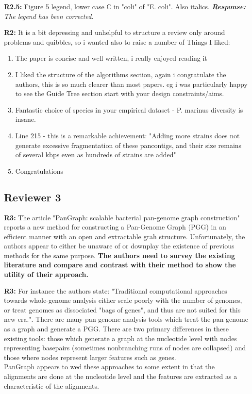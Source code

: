 \documentclass[aps,rmp,onecolumn]{revtex4-1}
\newcommand{\Marco}[1]{{\color{gray}Marco: #1}}
\newcommand{\reviewer}[2]{\textbf{#1:} #2\vskip 5mm}
\newcommand{\response}[1]{{\it {\color{response}\textbf{Response:} #1}}\vskip 5mm}
\begin{document}
\reviewer{R2.5}{Figure 5 legend, lower case C in "coli" of "E. coli". Also italics.}
\response{The legend has been corrected.}


\reviewer{R2}{It is a bit depressing and unhelpful to structure a review only around problems and quibbles, so i wanted also to raise a number of
      Things I liked:

      \begin{enumerate}
            \item The paper is concise and well written, i really enjoyed reading it
            \item I liked the structure of the algorithms section, again i congratulate the authors, this is so much clearer than most papers. eg i was particularly happy to see the Guide Tree section start with your design constraints/aims.
            \item Fantastic choice of species in your empirical dataset - P. marinus diversity is insane.
            \item Line 215 - this is a remarkable achievement: "Adding more strains does not generate excessive fragmentation of these pancontigs, and their size remains of several kbps even as hundreds of strains are added"
            \item Congratulations
      \end{enumerate}
}


\subsection*{Reviewer 3}

\reviewer{R3}{The article "PanGraph: scalable bacterial pan-genome graph construction" reports a new method for constructing a Pan-Genome Graph (PGG) in an efficient manner with an open and extractable grah structure. Unfortunately, the authors appear to either be unaware of or downplay the existence of previous methods for the same purpose.\textbf{ The authors need to survey the existing literature and compare and contrast with their method to show the utility of their approach.}}

\reviewer{R3}{For instance the authors state: "Traditional computational approaches towards whole-genome analysis either scale poorly with the number of genomes, or treat genomes as dissociated "bags of genes", and thus are not suited for this new era.". There are many pan-genome analysis tools which treat the pan-genome as a graph and generate a PGG. There are two primary differences in these existing tools: those which generate a graph at the nucleotide level with nodes representing basepairs (sometimes nonbranching runs of nodes are collapsed) and those where nodes represent larger features such as genes.\\
      PanGraph appears to wed these approaches to some extent in that the alignments are done at the nucleotide level and the features are extracted as a characteristic of the alignments.}
\end{document}

